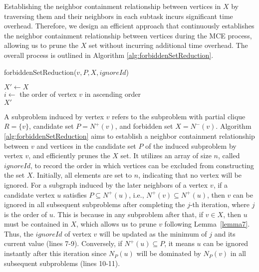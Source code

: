 \documentclass[sigconf, nonacm]{acmart}
\begin{document}
Establishing the neighbor containment relationship between vertices in $X$ by traversing them and their neighbors in each subtask incurs significant time overhead. %
Therefore, we design an efficient approach that continuously establishes the neighbor containment relationship between vertices during the MCE process, allowing us to prune the $X$ set without incurring additional time overhead. The overall process is outlined in Algorithm \ref{alg:forbiddenSetReduction}.

\begin{algorithm}[t]
    \SetNoFillComment
    \caption{forbiddenSetReduction($v, P, X, ignoreId$)}
    \label{alg:forbiddenSetReduction}
    \nl $X'\leftarrow X$ \\
    \nl $i \gets$ the order of vertex $v$ in ascending order \\
    \nl {}
    \nl {}
  \nl \KwRet $X'$ \\
\end{algorithm}

A subproblem induced by vertex $v$ refers to the subproblem with partial clique $R=\{v\}$, candidate set $P=N^+(v)$, and forbidden set $X=N^-(v)$. Algorithm \ref{alg:forbiddenSetReduction} aims to establish a neighbor containment relationship between $v$ and vertices in the candidate set $P$ of the induced subproblem by vertex $v$, and efficiently prunes the $X$ set. It utilizes an array of size $n$, called $ignoreId$, to record the order in which vertices can be excluded from constructing the set $X$. Initially, all elements are set to $n$, indicating that no vertex will be ignored.
For a subgraph induced by the later neighbors of a vertex $v$, if a candidate vertex $u$ satisfies $P \subseteq N^+(u)$, i.e., $N^+(v) \subseteq N^+(u)$, then $v$ can be ignored in all subsequent subproblems after completing the $j$-th iteration, where $j$ is the order of $u$. This is because in any subproblem after that, if $v \in X$, then $u$ must be contained in $X$, which allows us to prune $v$ following Lemma~\ref{lemma7}. Thus, the $ignoreId$ of vertex $v$ will be updated as the minimum of $j$ and its current value (lines 7-9). Conversely, if $N^+(u) \subseteq P$, it means $u$ can be ignored instantly after this iteration since $N_P(u)$ will be dominated by $N_P(v)$ in all subsequent subproblems (lines 10-11). 
\end{document}
